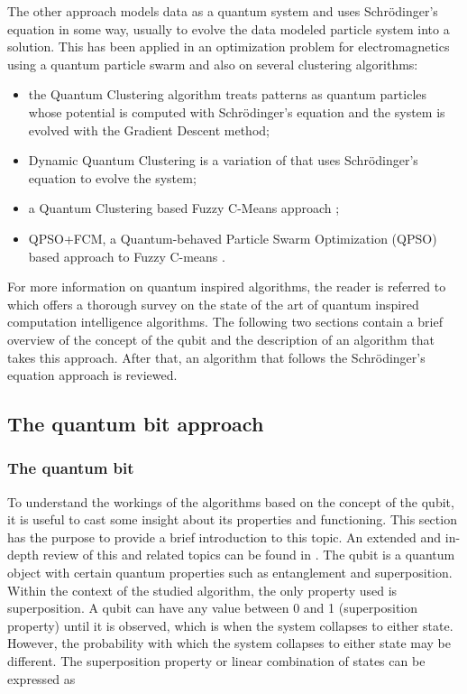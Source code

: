 The other approach models data as a quantum system and uses Schrödinger's equation in some way, usually to evolve the data modeled particle system into a solution.
This has been applied in an optimization problem for electromagnetics using a quantum particle swarm \cite{mikki2006quantum} and also on several clustering algorithms:
\begin{itemize}
	\item the Quantum Clustering \cite{Horn2001b} algorithm treats patterns as quantum particles whose potential is computed with Schrödinger's equation and the system is evolved with the Gradient Descent method;

	\item Dynamic Quantum Clustering \cite{Weinstein2009b} is a variation of \cite{Horn2001b} that uses Schrödinger's equation to evolve the system;

	\item a Quantum Clustering \cite{Horn2001b} based Fuzzy C-Means approach \cite{li2007quantum};

	\item QPSO+FCM, a Quantum-behaved Particle Swarm Optimization (QPSO) \cite{Sun2004} based approach to Fuzzy C-means \cite{Wang2007}.

\end{itemize}

For more information on quantum inspired algorithms, the reader is referred to \cite{Manju2014} which offers a thorough survey on the state of the art of quantum inspired computation intelligence algorithms.
The following two sections contain a brief overview of the concept of the qubit and the description of an algorithm that takes this approach.
After that, an algorithm that follows the Schrödinger's equation approach is reviewed.

\subsection{The quantum bit approach}
\label{sec:qubit}

\subsubsection{The quantum bit}

To understand the workings of the algorithms based on the concept of the qubit, it is useful to cast some insight about its properties and functioning.
This section has the purpose to provide a brief introduction to this topic.
An extended and in-depth review of this and related topics can be found in \cite{Lanzagorta2008}.
The qubit is a quantum object with certain quantum properties such as entanglement and superposition.
Within the context of the studied algorithm, the only property used is superposition.
A qubit can have any value between 0 and 1 (superposition property) until it is observed, which is when the system collapses to either state.
However, the probability with which the system collapses to either state  may be different.
The superposition property or linear combination of states can be expressed \cite{Casper2012KMeans} as %


